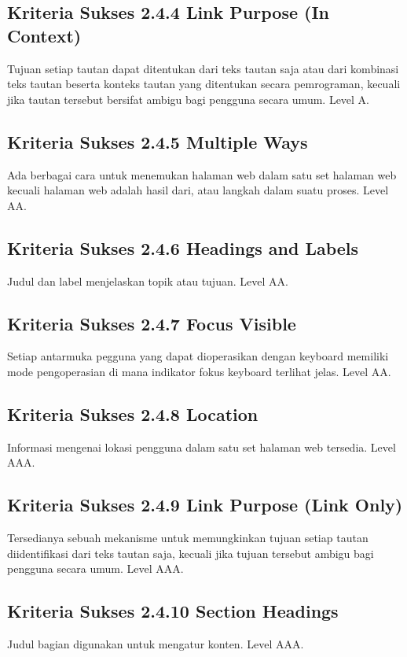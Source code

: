 \subsection{Kriteria Sukses 2.4.4 Link Purpose (In Context)}
\label{sec:kriteria_2.4.4}
Tujuan setiap tautan dapat ditentukan dari teks tautan saja atau dari kombinasi teks tautan beserta konteks tautan yang ditentukan secara pemrograman, kecuali jika tautan tersebut bersifat ambigu bagi pengguna secara umum.
Level A.

\subsection{Kriteria Sukses 2.4.5 Multiple Ways}
\label{sec:kriteria_2.4.5}
Ada berbagai cara untuk menemukan halaman web dalam satu set halaman web kecuali halaman web adalah hasil dari, atau langkah dalam suatu proses.
Level AA.

\subsection{Kriteria Sukses 2.4.6 Headings and Labels}
\label{sec:kriteria_2.4.6}
Judul dan label menjelaskan topik atau tujuan.
Level AA.

\subsection{Kriteria Sukses 2.4.7 Focus Visible}
\label{sec:kriteria_2.4.7}
Setiap antarmuka pegguna yang dapat dioperasikan dengan keyboard memiliki mode pengoperasian di mana indikator fokus keyboard terlihat jelas.
Level AA.

\subsection{Kriteria Sukses 2.4.8 Location}
\label{sec:kriteria_2.4.8}
Informasi mengenai lokasi pengguna dalam satu set halaman web tersedia.
Level AAA.

\subsection{Kriteria Sukses 2.4.9 Link Purpose (Link Only)}
\label{sec:kriteria_2.4.9}
Tersedianya sebuah mekanisme untuk memungkinkan tujuan setiap tautan diidentifikasi dari teks tautan saja, kecuali jika tujuan tersebut ambigu bagi pengguna secara umum.
Level AAA.

\subsection{Kriteria Sukses 2.4.10 Section Headings}
\label{sec:kriteria_2.4.10}
Judul bagian digunakan untuk mengatur konten.
Level AAA.

